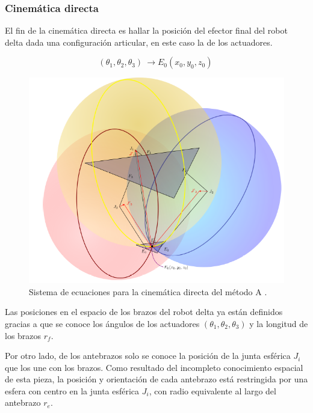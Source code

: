         
        
        
        \newpage

    
        \subsubsection{Cinemática directa} \label{ma_cd}
        El fin de la cinemática directa es hallar la posición del efector final del robot delta dada una configuración articular, en este caso la de los actuadores.

        \begin{equation}
            \left({\theta }_1,{\theta }_2,{\theta }_3\right)\ \to E_0(x_0,y_0,z_0)\
        \end{equation}

        \begin{figure}[htb]
             \centering
             \includegraphics[width=0.8\linewidth]{Main/Chapter4/Images4/Metodo_A_Modelacion_Cinematica_Posicion_3.png}
              \caption{Sistema de ecuaciones para la cinemática directa del método A \cite{Diseno_e_implementacion_de_un_sistema_de_control_para_la_representacion_grafica_a_partir_de_imagenes}.}
              \label{f:Cap4_Metodo_A_Modelacion_Cinematica_Posicion_3}
        \end{figure}
        
        Las posiciones en el espacio de los brazos del robot delta ya están definidos gracias a que se conoce los ángulos de los actuadores $({\theta }_1,{\theta }_2,{\theta }_3)$ y la longitud de los brazos $r_f$. 
        
        Por otro lado, de los antebrazos solo se conoce la posición de la junta esférica $J_i$ que los une con los brazos. Como resultado del incompleto conocimiento espacial de esta pieza, la posición y orientación de cada antebrazo está restringida por una esfera con centro en la junta esférica $J_i$, con radio equivalente al largo del antebrazo $r_e$. 
        
